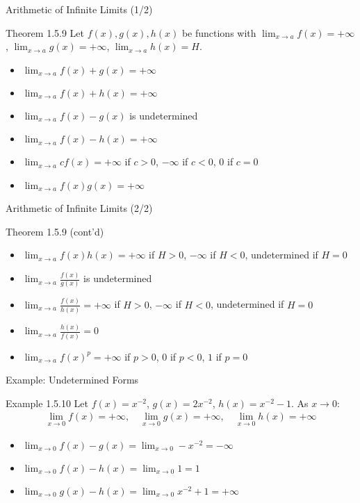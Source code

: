 \documentclass[aspectratio=169]{beamer}
\newcommand{\limx}[2]{\lim_{x \to #1} #2}
\begin{document}
\begin{frame}{Arithmetic of Infinite Limits (1/2)}
\begin{block}{Theorem 1.5.9}
Let $f(x), g(x), h(x)$ be functions with $\limx{a}{f(x)} = +\infty$, $\limx{a}{g(x)} = +\infty$, $\limx{a}{h(x)} = H$.
\begin{itemize}
  \item $\limx{a}{f(x)+g(x)} = +\infty$
  \item $\limx{a}{f(x)+h(x)} = +\infty$
  \item $\limx{a}{f(x)-g(x)}$ is undetermined
  \item $\limx{a}{f(x)-h(x)} = +\infty$
  \item $\limx{a}{c f(x)} = +\infty$ if $c>0$, $-\infty$ if $c<0$, $0$ if $c=0$
  \item $\limx{a}{f(x)g(x)} = +\infty$
\end{itemize}
\end{block}
\end{frame}

\begin{frame}{Arithmetic of Infinite Limits (2/2)}
\begin{block}{Theorem 1.5.9 (cont'd)}
\begin{itemize}
  \item $\limx{a}{f(x)h(x)} = +\infty$ if $H>0$, $-\infty$ if $H<0$, undetermined if $H=0$
  \item $\limx{a}{\frac{f(x)}{g(x)}}$ is undetermined
  \item $\limx{a}{\frac{f(x)}{h(x)}} = +\infty$ if $H>0$, $-\infty$ if $H<0$, undetermined if $H=0$
  \item $\limx{a}{\frac{h(x)}{f(x)}} = 0$
  \item $\limx{a}{f(x)^p} = +\infty$ if $p>0$, $0$ if $p<0$, $1$ if $p=0$
\end{itemize}
\end{block}
\end{frame}

\begin{frame}{Example: Undetermined Forms}
\begin{block}{Example 1.5.10}
Let $f(x) = x^{-2}$, $g(x) = 2x^{-2}$, $h(x) = x^{-2}-1$. As $x \to 0$:
\begin{align*}
\limx{0}{f(x)} = +\infty,\quad \limx{0}{g(x)} = +\infty,\quad \limx{0}{h(x)} = +\infty
\end{align*}
\begin{itemize}
  \item $\limx{0}{f(x)-g(x)} = \limx{0}{-x^{-2}} = -\infty$
  \item $\limx{0}{f(x)-h(x)} = \limx{0}{1} = 1$
  \item $\limx{0}{g(x)-h(x)} = \limx{0}{x^{-2}+1} = +\infty$
\end{itemize}
\end{block}
\end{frame}
\end{document}
